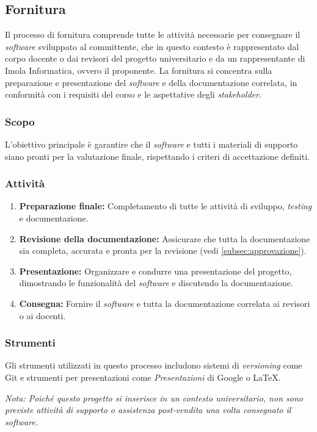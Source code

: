 \subsection{Fornitura}

Il processo di fornitura comprende tutte le attività necessarie per consegnare
il \textit{software} sviluppato al committente, che in questo contesto è
rappresentato dal corpo docente o dai revisori del progetto universitario e da
un rappresentante di Imola Informatica, ovvero il proponente.
La fornitura si concentra sulla preparazione e
presentazione del \textit{software} e della documentazione correlata, in
conformità con i requisiti del corso e le aspettative degli \textit{stakeholder}.

\subsubsection{Scopo}
L'obiettivo principale è garantire che il \textit{software} e tutti i materiali
di supporto siano pronti per la valutazione finale, rispettando i criteri di
accettazione definiti.

\subsubsection{Attività}
\begin{enumerate}
	\item \textbf{Preparazione finale:} Completamento di tutte le attività di
	      sviluppo, \textit{testing} e documentazione.
	\item \textbf{Revisione della documentazione:} Assicurare che tutta la
	      documentazione sia completa, accurata e pronta per la revisione
	      (vedi \autoref{subsec:approvazione}).
	\item \textbf{Presentazione:} Organizzare e condurre una presentazione del
	      progetto, dimostrando le funzionalità del \textit{software} e
	      discutendo la documentazione.
	\item \textbf{Consegna:} Fornire il \textit{software} e tutta la
	      documentazione correlata ai revisori o ai docenti.
\end{enumerate}

\subsubsection{Strumenti}
Gli strumenti utilizzati in questo processo includono sistemi di
\textit{versioning} come Git e strumenti per presentazioni come
\textit{Presentazioni} di Google o LaTeX.

\textit{Nota: Poiché questo progetto si inserisce in un contesto universitario,
	non sono previste attività di supporto o assistenza post-vendita una volta
	consegnato il \textit{software}.}
